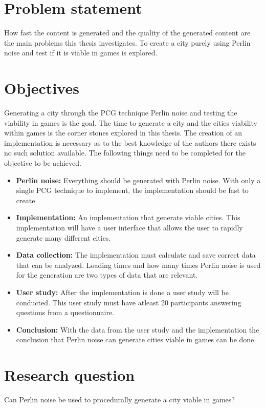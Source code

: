 	\section{Problem statement}
	How fast the content is generated and the quality of the generated content are the main problems this thesis investigates.
	To create a city purely using Perlin noise and test if it is viable in games is explored.
	
	\section{Objectives}
	Generating a city through the PCG technique Perlin noise and testing the viability in games is the goal. The time to generate a city and the cities viability within games is the corner stones explored in this thesis. The creation of an implementation is necessary as to the best knowledge of the authors there exists no such solution available.
	The following things need to be completed for the objective to be achieved.
	
	\begin{itemize}
		\item \textbf{Perlin noise:} Everything should be generated with Perlin noise.
		With only a single PCG technique to implement, the implementation should be fast to create.
		
		\item \textbf{Implementation:} An implementation that generate viable cities. This implementation will have a user interface that allows the user to rapidly generate many different cities.
		
		\item \textbf{Data collection:} The implementation must calculate and save correct data that can be analyzed. Loading times and how many times Perlin noise is used for the generation are two types of data that are relevant.
		
		\item \textbf{User study:} After the implementation is done a user study will be conducted. This user study must have atleast 20 participants answering questions from a questionnaire.
		
		\item \textbf{Conclusion: } With the data from the user study and the implementation the conclusion that Perlin noise can generate cities viable in games can be done.
	\end{itemize} 
	
	\section{Research question}
	Can Perlin noise be used to procedurally generate a city viable in games?
